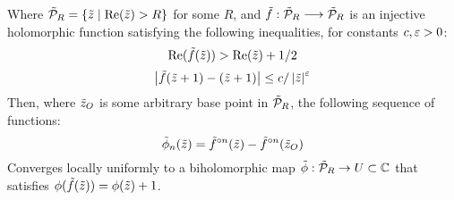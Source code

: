 \documentclass[../main.tex]{subfiles}
\begin{document}
\begin{lem}
    \label{10:lem:That}
    Where $\tilde{\mathcal{P}}_R=\{\tilde{z}\mid \mathrm{Re}(\tilde{z}) > R\}$ for some $R$, and $\tilde{f}:\tilde{\mathcal{P}}_R\longrightarrow\tilde{\mathcal{P}}_R$ is an injective holomorphic function satisfying the following inequalities, for constants $c, \varepsilon > 0$:
    \begin{equation*}
        \mathrm{Re}(\tilde{f}(\tilde{z})) > \mathrm{Re}(\tilde{z}) + 1/2
    \end{equation*}
    \begin{equation*}
        \left|\tilde{f}(\tilde{z}+1)-(\tilde{z}+1)\right| \le c/\left|\tilde{z}\right|^{\varepsilon}
    \end{equation*}
    Then, where $\tilde{z}_O$ is some arbitrary base point in $\tilde{\mathcal{P}}_R$, the following sequence of functions: 
    \begin{equation*}
        \tilde{\phi}_n(\tilde{z})=\tilde{f}^{\circ n}(\tilde{z})-\tilde{f}^{\circ n}(\tilde{z}_O)
    \end{equation*}
    Converges locally uniformly to a biholomorphic map $\tilde{\phi}:\tilde{\mathcal{P}}_R\to U\subset \mathbb{C}$ that satisfies $\phi(\tilde{f}(\tilde{z}))=\phi(\tilde{z})+1$.
\end{lem}
\end{document}
